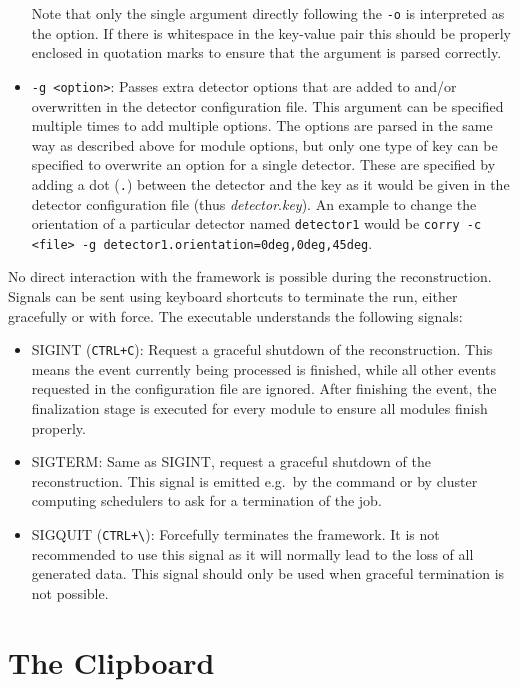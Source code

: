 \begin{itemize}
\begin{itemize}
\end{itemize}
Note that only the single argument directly following the \texttt{-o} is interpreted as the option. If there is whitespace in the key-value pair this should be properly enclosed in quotation marks to ensure that the argument is parsed correctly.
\item \texttt{-g <option>}: Passes extra detector options that are added to and/or overwritten in the detector configuration file.
This argument can be specified multiple times to add multiple options.
The options are parsed in the same way as described above for module options, but only one type of key can be specified to overwrite an option for a single detector.
These are specified by adding a dot (\texttt{.}) between the detector and the key as it would be given in the detector configuration file (thus \textit{detector}.\textit{key}). An example to change the orientation of a particular detector named \texttt{detector1} would be \texttt{corry -c <file> -g detector1.orientation=0deg,0deg,45deg}.
\end{itemize}

No direct interaction with the framework is possible during the reconstruction. Signals can be sent using keyboard shortcuts to terminate the run, either gracefully or with force. The executable understands the following signals:
\begin{itemize}
\item SIGINT (\texttt{CTRL+C}): Request a graceful shutdown of the reconstruction. This means the event currently being processed is finished, while all other events requested in the configuration file are ignored. After finishing the event, the finalization stage is executed for every module to ensure all modules finish properly.
\item SIGTERM: Same as SIGINT, request a graceful shutdown of the reconstruction. This signal is emitted e.g.\ by the  command or by cluster computing schedulers to ask for a termination of the job.
\item SIGQUIT (\texttt{CTRL+\textbackslash}): Forcefully terminates the framework. It is not recommended to use this signal as it will normally lead to the loss of all generated data. This signal should only be used when graceful termination is not possible.
\end{itemize}

\section{The Clipboard}

